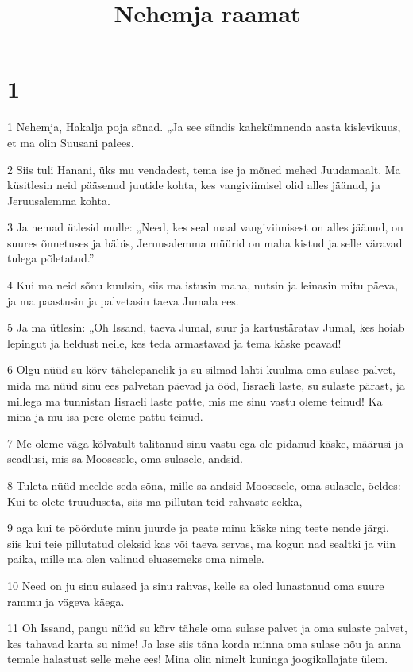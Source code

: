 

\title{Nehemja raamat}

\chapter{1}

\par 1 Nehemja, Hakalja poja sõnad. „Ja see sündis kahekümnenda aasta kislevikuus, et ma olin Suusani palees.
\par 2 Siis tuli Hanani, üks mu vendadest, tema ise ja mõned mehed Juudamaalt. Ma küsitlesin neid pääsenud juutide kohta, kes vangiviimisel olid alles jäänud, ja Jeruusalemma kohta.
\par 3 Ja nemad ütlesid mulle: „Need, kes seal maal vangiviimisest on alles jäänud, on suures õnnetuses ja häbis, Jeruusalemma müürid on maha kistud ja selle väravad tulega põletatud.”
\par 4 Kui ma neid sõnu kuulsin, siis ma istusin maha, nutsin ja leinasin mitu päeva, ja ma paastusin ja palvetasin taeva Jumala ees.
\par 5 Ja ma ütlesin: „Oh Issand, taeva Jumal, suur ja kartustäratav Jumal, kes hoiab lepingut ja heldust neile, kes teda armastavad ja tema käske peavad!
\par 6 Olgu nüüd su kõrv tähelepanelik ja su silmad lahti kuulma oma sulase palvet, mida ma nüüd sinu ees palvetan päevad ja ööd, Iisraeli laste, su sulaste pärast, ja millega ma tunnistan Iisraeli laste patte, mis me sinu vastu oleme teinud! Ka mina ja mu isa pere oleme pattu teinud.
\par 7 Me oleme väga kõlvatult talitanud sinu vastu ega ole pidanud käske, määrusi ja seadlusi, mis sa Moosesele, oma sulasele, andsid.
\par 8 Tuleta nüüd meelde seda sõna, mille sa andsid Moosesele, oma sulasele, öeldes: Kui te olete truuduseta, siis ma pillutan teid rahvaste sekka,
\par 9 aga kui te pöördute minu juurde ja peate minu käske ning teete nende järgi, siis kui teie pillutatud oleksid kas või taeva servas, ma kogun nad sealtki ja viin paika, mille ma olen valinud eluasemeks oma nimele.
\par 10 Need on ju sinu sulased ja sinu rahvas, kelle sa oled lunastanud oma suure rammu ja vägeva käega.
\par 11 Oh Issand, pangu nüüd su kõrv tähele oma sulase palvet ja oma sulaste palvet, kes tahavad karta su nime! Ja lase siis täna korda minna oma sulase nõu ja anna temale halastust selle mehe ees! Mina olin nimelt kuninga joogikallajate ülem.

